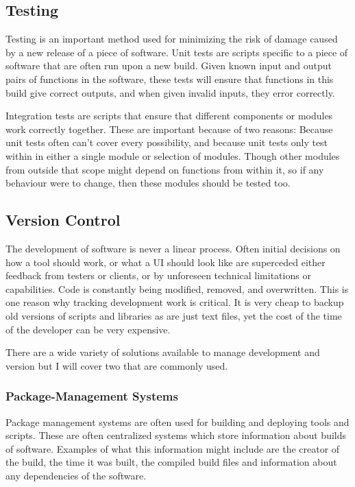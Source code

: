 \hypertarget{testing}{%
\subsection{Testing}\label{testing}}

Testing is an important method used for minimizing the risk of damage caused by a new release of a piece of software. Unit tests are scripts specific to a piece of software that are often run upon a new build. Given known input and output pairs of functions in the software, these tests will ensure that functions in this build give correct outputs, and when given invalid inputs, they error correctly.

Integration tests are scripts that ensure that different components or modules work correctly together. These are important because of two reasons: Because unit tests often can't cover every possibility, and because unit tests only test within in either a single module or selection of modules. Though other modules from outside that scope might depend on functions from within it, so if any behaviour were to change, then these modules should be tested too.

\hypertarget{version-control-1}{%
\subsection{Version Control}\label{version-control-1}}

The development of software is never a linear process. Often initial decisions on how a tool should work, or what a UI should look like are superceded either feedback from testers or clients, or by unforeseen technical limitations or capabilities. Code is constantly being modified, removed, and overwritten. This is one reason why tracking development work is critical. It is very cheap to backup old versions of scripts and libraries as are just text files, yet the cost of the time of the developer can be very expensive.

There are a wide variety of solutions available to manage development and version but I will cover two that are commonly used.

\hypertarget{package-management-systems}{%
\subsubsection{Package-Management Systems}\label{package-management-systems}}

Package management systems are often used for building and deploying tools and scripts. These are often centralized systems which store information about builds of software. Examples of what this information might include are the creator of the build, the time it was built, the compiled build files and information about any dependencies of the software.

